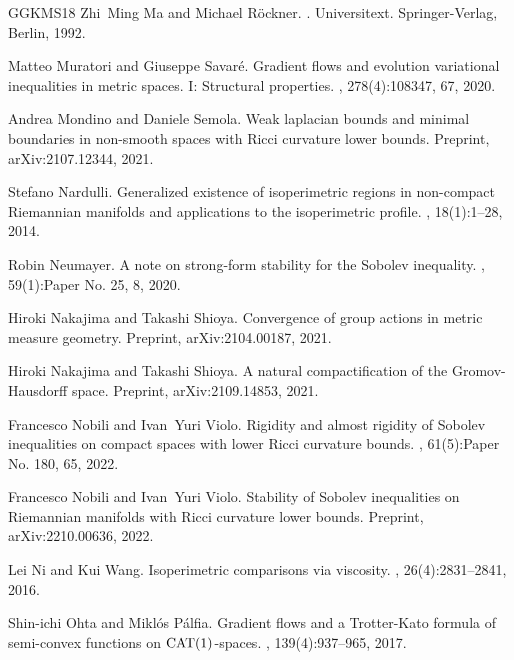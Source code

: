 \documentclass[11pt]{article}
\numberwithin{equation}{section}
\begin{document}
{\begin{thebibliography}{GGKMS18}
Zhi~Ming Ma and Michael R{\"o}ckner.
.
\newblock Universitext. Springer-Verlag, Berlin, 1992.

Matteo Muratori and Giuseppe Savar\'{e}.
\newblock Gradient flows and evolution variational inequalities in metric
  spaces. {I}: {S}tructural properties.
, 278(4):108347, 67, 2020.

Andrea Mondino and Daniele Semola.
\newblock Weak laplacian bounds and minimal boundaries in non-smooth spaces
  with {R}icci curvature lower bounds.
\newblock Preprint, arXiv:2107.12344, 2021.

Stefano Nardulli.
\newblock Generalized existence of isoperimetric regions in non-compact
  {R}iemannian manifolds and applications to the isoperimetric profile.
, 18(1):1--28, 2014.

Robin Neumayer.
\newblock A note on strong-form stability for the {S}obolev inequality.
, 59(1):Paper No. 25,
  8, 2020.

Hiroki Nakajima and Takashi Shioya.
\newblock Convergence of group actions in metric measure geometry.
\newblock Preprint, arXiv:2104.00187, 2021.

Hiroki Nakajima and Takashi Shioya.
\newblock A natural compactification of the {G}romov-{H}ausdorff space.
\newblock Preprint, arXiv:2109.14853, 2021.

Francesco Nobili and Ivan~Yuri Violo.
\newblock Rigidity and almost rigidity of {S}obolev inequalities on compact
  spaces with lower {R}icci curvature bounds.
, 61(5):Paper No. 180,
  65, 2022.

Francesco Nobili and Ivan~Yuri Violo.
\newblock Stability of {S}obolev inequalities on {R}iemannian manifolds with
  {R}icci curvature lower bounds.
\newblock Preprint, arXiv:2210.00636, 2022.

Lei Ni and Kui Wang.
\newblock Isoperimetric comparisons via viscosity.
, 26(4):2831--2841, 2016.

Shin-ichi Ohta and Mikl\'{o}s P\'{a}lfia.
\newblock Gradient flows and a {T}rotter-{K}ato formula of semi-convex
  functions on {${\rm CAT}(1)$}-spaces.
, 139(4):937--965, 2017.


\end{thebibliography}}
\end{document}
